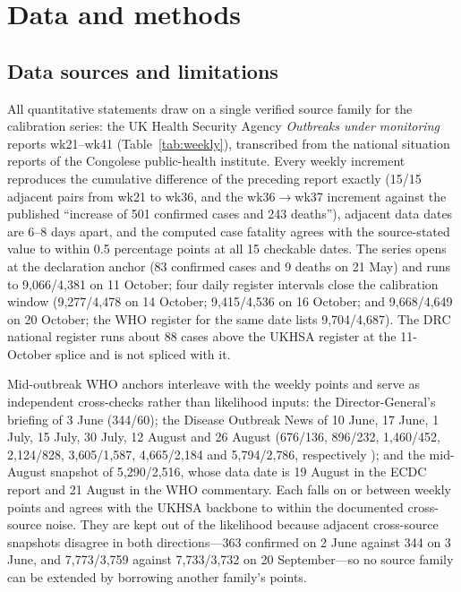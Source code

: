 \documentclass[10pt]{plos}
\begin{document}
\section{Data and methods}\label{sec:methods}

\subsection{Data sources and limitations}\label{sec:data}

All quantitative statements draw on a single verified source family for
the calibration series: the UK Health Security Agency \emph{Outbreaks
under monitoring} reports wk21--wk41 (Table~\ref{tab:weekly}),
transcribed from the national situation reports of the Congolese
public-health institute. Every weekly increment reproduces the
cumulative difference of the preceding report exactly (15/15 adjacent
pairs from wk21 to wk36, and the wk36$\to$wk37 increment against the
published ``increase of 501 confirmed cases and 243 deaths''), adjacent
data dates are 6--8 days apart, and the computed case fatality agrees
with the source-stated value to within 0.5 percentage points at all 15
checkable dates. The series opens at the declaration anchor (83
confirmed cases and 9 deaths on 21 May) and runs to
9{,}066/4{,}381 on 11 October; four daily register intervals close the
calibration window (9{,}277/4{,}478 on 14 October;
9{,}415/4{,}536 on 16 October; and
9{,}668/4{,}649 on 20 October; the WHO register for the same date lists 9{,}704/4{,}687). The DRC national
register runs about 88 cases above the UKHSA register at the
11-October splice and is not spliced with it.

Mid-outbreak WHO anchors interleave with the weekly points and serve as
independent cross-checks rather than likelihood inputs: the
Director-General's briefing of 3 June (344/60); the
Disease Outbreak News of 10 June, 17 June, 1 July, 15 July, 30 July, 12
August and 26 August (676/136, 896/232, 1{,}460/452, 2{,}124/828,
3{,}605/1{,}587, 4{,}665/2{,}184 and 5{,}794/2{,}786, respectively
);
and the mid-August snapshot of 5{,}290/2{,}516, whose data date is 19
August in the ECDC report and 21 August in the WHO commentary. Each falls on or between weekly points and
agrees with the UKHSA backbone to within the documented cross-source
noise. They are kept out of the likelihood because adjacent
cross-source snapshots disagree in both directions---363 confirmed on 2
June against 344 on 3 June, and 7{,}773/3{,}759 against 7{,}733/3{,}732
on 20 September---so no source family can be
extended by borrowing another family's points.
\end{document}
